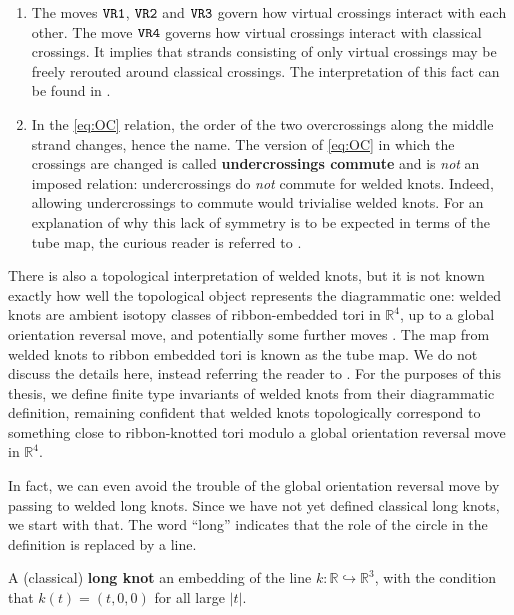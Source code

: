 \begin{definition}
\begin{remarks}
\begin{enumerate}
			\item The moves \(\texttt{VR1}\), \(\texttt{VR2}\) and \(\texttt{VR3}\) govern how virtual crossings interact with each other. The move \(\texttt{VR4}\) governs how virtual crossings interact with classical crossings. It implies that strands consisting of only virtual crossings may be freely rerouted around classical crossings. The interpretation of this fact can be found in \cite{virtual-knot-theory}.
			\item In the \ref{eq:OC} relation, the order of the two overcrossings along the middle strand changes, hence the name. The version of \ref{eq:OC} in which the crossings are changed is called \textbf{undercrossings commute} and is \textit{not} an imposed relation: undercrossings do \textit{not} commute for welded knots. Indeed, allowing undercrossings to commute would trivialise welded knots. For an explanation of why this lack of symmetry is to be expected in terms of the tube map, the curious reader is referred to \cite[Sec. 2.2]{finite-type-invariants-of-w-knotted-objects-I-w-knots-and-the-alexander-polynomial}.
		\end{enumerate}
	\end{remarks}
\end{definition}

There is also a topological interpretation of welded knots, but it is not known exactly how well the topological object represents the diagrammatic one: welded knots are ambient isotopy classes of ribbon-embedded tori in \(\mathbb{R}^{4}\), up to a global orientation reversal move, and potentially some further moves \cite{virtual-knot-presentation-of-ribbon-torus-knots, welded-graphs-wirtinger-groups-and-knotted-punctured-spheres}. The map from welded knots to ribbon embedded tori is known as the tube map. We do not discuss the details here, instead referring the reader to \cite{on-the-welded-tube-map}. For the purposes of this thesis, we define finite type invariants of welded knots from their diagrammatic definition, remaining confident that welded knots topologically correspond to something close to ribbon-knotted tori modulo a global orientation reversal move in \(\mathbb{R}^{4}\).

In fact, we can even avoid the trouble of the global orientation reversal move by passing to welded long knots. Since we have not yet defined classical long knots, we start with that. The word ``long'' indicates that the role of the circle in the definition is replaced by a line.

\begin{definition}
	A (classical) \textbf{long knot} an embedding of the line \(k: \mathbb{R} \hookrightarrow \mathbb{R}^{3}\), with the condition that \(k(t) = (t, 0, 0)\) for all large \(|t|\).
\end{definition}

